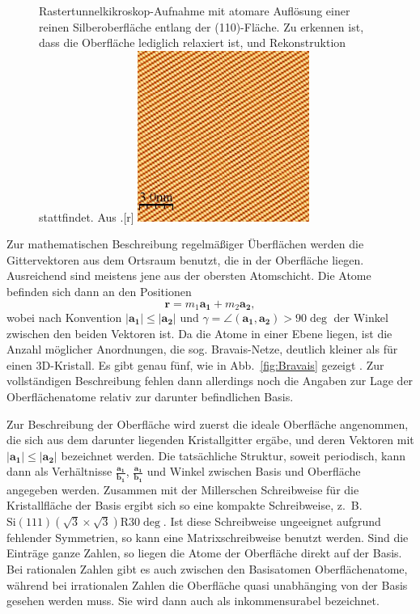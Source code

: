 \begin{figure}[!t]
  \begin{captionbeside}[]{Rastertunnelkikroskop-Aufnahme mit atomare Auflösung einer reinen 
Silberoberfläche entlang der (110)-Fläche. Zu erkennen ist, dass die Oberfläche 
lediglich relaxiert ist, und Rekonstruktion stattfindet. 
Aus \cite{kahn:stm_images}.}[r]
    \includegraphics[width=0.5\textwidth]{pics/Ag(110)_clean}
  \end{captionbeside}
  \label{fig:Ag(110)}
\end{figure}

Zur mathematischen Beschreibung regelmäßiger Überflächen werden die Gittervektoren 
aus dem Ortsraum benutzt, die in der Oberfläche liegen. Ausreichend sind meistens 
jene aus der obersten Atomschicht. Die Atome befinden sich dann an den Positionen 
\begin{equation}
    \mathbf{r} = m_1 \mathbf{a_1} + m_2 \mathbf{a_2},
\end{equation}
wobei nach Konvention $|\mathbf{a_1}| \le |\mathbf{a_2}|$ und 
$\gamma = \angle (\mathbf{a_1}, \mathbf{a_2}) > 90 \deg$ der Winkel zwischen den 
beiden Vektoren ist. Da die Atome in einer Ebene liegen, ist die Anzahl möglicher 
Anordnungen, die sog. Bravais-Netze, deutlich kleiner als für einen 3D-Kristall. 
Es gibt genau fünf, wie in Abb.~\ref{fig:Bravais} gezeigt 
\cite{henzler1991oberflachenphysik}.
Zur vollständigen Beschreibung fehlen dann allerdings noch die Angaben zur Lage 
der Oberflächenatome relativ zur darunter befindlichen Basis. 

Zur Beschreibung der Oberfläche wird zuerst die ideale Oberfläche angenommen, 
die sich aus dem darunter liegenden Kristallgitter ergäbe, und deren Vektoren mit
$|\mathbf{a_1}| \le |\mathbf{a_2}|$ bezeichnet werden. Die tatsächliche Struktur, 
soweit periodisch, kann dann als Verhältnisse $\frac{\mathbf{a_1}}{\mathbf{b_1}}$, 
$\frac{\mathbf{a_1}}{\mathbf{b_1}}$ und Winkel zwischen Basis und Oberfläche angegeben 
werden. Zusammen mit der Millerschen Schreibweise für die Kristallfläche der Basis 
ergibt sich so eine kompakte Schreibweise, z.~B. 
$\mathrm{Si}(111)(\sqrt{3} \times \sqrt{3}) \mathrm{R} 30 \deg$. 
Ist diese Schreibweise ungeeignet aufgrund fehlender Symmetrien, so kann eine 
Matrixschreibweise benutzt werden. Sind die Einträge ganze Zahlen, so liegen die 
Atome der Oberfläche direkt auf der Basis. Bei rationalen Zahlen gibt es auch 
zwischen den Basisatomen Oberflächenatome, während bei irrationalen Zahlen die 
Oberfläche quasi unabhänging von der Basis gesehen werden muss. Sie wird dann auch 
als inkommensurabel bezeichnet\cite{henzler1991oberflachenphysik}.

